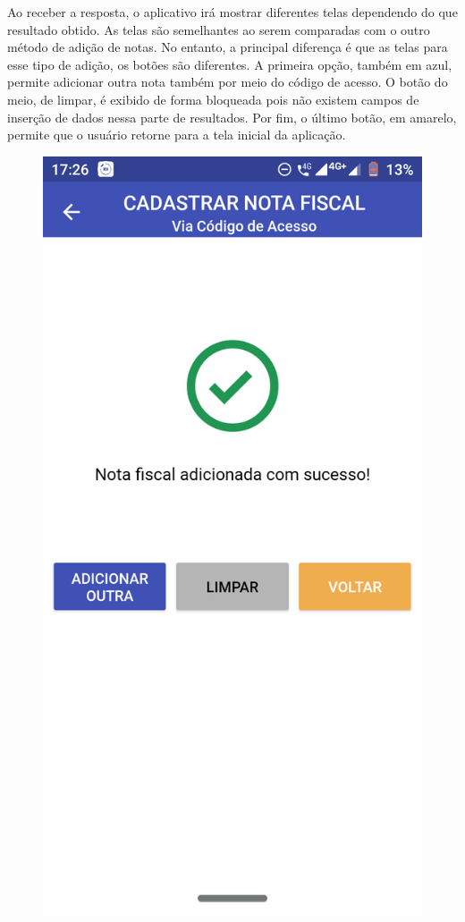 Ao receber a resposta, o aplicativo irá mostrar diferentes telas dependendo do que resultado obtido. As telas são semelhantes ao serem comparadas com o outro método de adição de notas. No entanto, a principal diferença é que as telas para esse tipo de adição, os botões são diferentes. A primeira opção, também em azul, permite adicionar outra nota também por meio do código de acesso. O botão do meio, de limpar, é exibido de forma bloqueada pois não existem campos de inserção de dados nessa parte de resultados. Por fim, o último botão, em amarelo, permite que o usuário retorne para a tela inicial da aplicação.

\newpage
\begin{figure}[h]
    \centering
    \includegraphics[scale=0.15]{tcc/figures/app/app_codigo_acesso_sucesso.png}

\end{figure}
